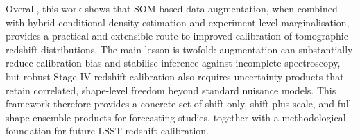 Overall, this work shows that SOM-based data augmentation, when combined with hybrid conditional-density estimation and experiment-level marginalisation, provides a practical and extensible route to improved calibration of tomographic redshift distributions. The main lesson is twofold: augmentation can substantially reduce calibration bias and stabilise inference against incomplete spectroscopy, but robust Stage-IV redshift calibration also requires uncertainty products that retain correlated, shape-level freedom beyond standard nuisance models. This framework therefore provides a concrete set of shift-only, shift-plus-scale, and full-shape ensemble products for forecasting studies, together with a methodological foundation for future LSST redshift calibration.